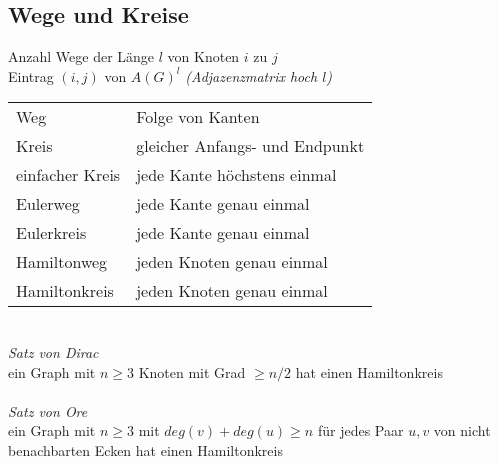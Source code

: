\subsection{Wege und Kreise}

Anzahl Wege der Länge $l$ von Knoten $i$ zu $j$ \\
Eintrag $(i,j)$ von $A(G)^l$ \textit{(Adjazenzmatrix hoch $l$)} \\

\begin{tabular}{@{}ll}
    Weg & Folge von Kanten \\
    Kreis & gleicher Anfangs- und Endpunkt \\
    einfacher Kreis & jede Kante höchstens einmal \\
    Eulerweg & jede Kante genau einmal \\
    Eulerkreis & jede Kante genau einmal \\
    Hamiltonweg & jeden Knoten genau einmal \\
    Hamiltonkreis & jeden Knoten genau einmal \\
\end{tabular} \\

\textit{Satz von Dirac} \\
ein Graph mit $n \geq 3$ Knoten mit Grad $\geq n/2$ hat einen Hamiltonkreis \\
\\
\textit{Satz von Ore} \\ 
ein Graph mit $n \geq 3$ mit ${deg}(v)+{deg(u) \geq n}$ für jedes Paar $u,v$ von nicht benachbarten Ecken hat einen Hamiltonkreis
